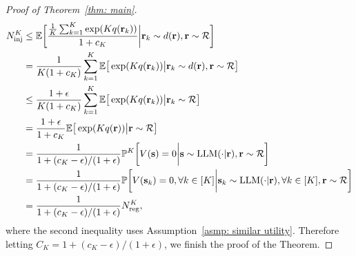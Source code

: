 \begin{proof} [Proof of Theorem~\ref{thm: main}]
\begin{align}
N_{\text{inj}}^K &\leq \mathbb{E} \bigg[ \frac{\frac{1}{K} \sum_{k=1}^K \exp(Kq(\mathbf{r}_k))} {1 + c_K} \bigg| \mathbf{r}_k \sim d(\mathbf{r}), \mathbf{r} \sim \mathcal{R} \bigg] \notag \\
&= \frac{1}{K (1 + c_K)} \sum_{k = 1}^K \mathbb{E} \big[ \exp(Kq(\mathbf{r}_k)) \big| \mathbf{r}_k \sim d(\mathbf{r}), \mathbf{r} \sim \mathcal{R} \big] \notag \\
&\leq \frac{1 + \epsilon}{K (1 + c_K)} \sum_{k = 1}^K \mathbb{E} \big[ \exp(Kq(\mathbf{r}_k)) \big| \mathbf{r}_k \sim \mathcal{R} \big] \notag \\
&= \frac{1 + \epsilon}{1 + c_K} \mathbb{E} \big[ \exp(Kq(\mathbf{r})) \big| \mathbf{r} \sim \mathcal{R} \big] \notag \\
&= \frac{1}{1 + (c_K - \epsilon) / (1 + \epsilon)} \mathbb{P}^K \bigg[ V(\mathbf{s}) = 0 \bigg| \mathbf{s} \sim \text{LLM}(\cdot | \mathbf{r}), \mathbf{r} \sim \mathcal{R} \bigg] \notag \\
&= \frac{1}{1 + (c_K - \epsilon) / (1 + \epsilon)} \mathbb{P} \bigg[ V(\mathbf{s}_k) = 0, \forall k \in [K] \bigg| \mathbf{s}_k \sim \text{LLM}(\cdot | \mathbf{r}), \forall k \in [K], \mathbf{r} \sim \mathcal{R} \bigg] \notag \\
&= \frac{1}{1 + (c_K - \epsilon) / (1 + \epsilon)} N_{\text{reg}}^K, \notag
\end{align}
where the second inequality uses Assumption~\ref{asmp: similar utility}. Therefore letting $C_K = 1 + (c_K - \epsilon) / (1 + \epsilon)$, we finish the proof of the Theorem. 
\end{proof}